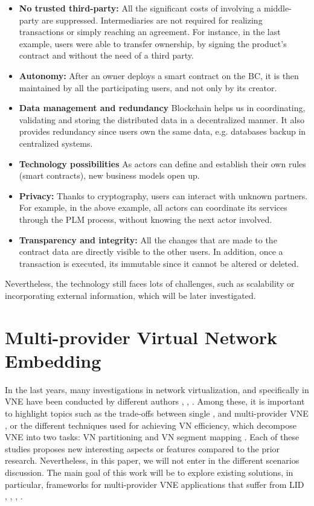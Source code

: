 \begin{itemize}
	\item \textbf{No trusted third-party:} All the significant costs of involving a middle-party are suppressed\citep{mainelli2015sharing}. Intermediaries are not required for realizing transactions or simply reaching an agreement. For instance, in the last example, users were able to transfer ownership, by signing the product's contract and without the need of a third party.
	\item \textbf{Autonomy:} After an owner deploys a smart contract on the BC, it is then maintained by all the participating users, and not only by its creator.
	\item \textbf{Data management and redundancy} Blockchain helps us in coordinating, validating and storing the distributed data in a decentralized manner. It also provides redundancy since users own the same data, e.g. databases backup in centralized systems. 
	\item \textbf{Technology possibilities} As actors can define and establish their own rules (smart contracts), new business models open up.
	\item \textbf{Privacy:} Thanks to cryptography, users can interact with unknown partners. For example, in the above example, all actors can coordinate its services through the PLM process, without knowing the next actor involved. 
    \item \textbf{Transparency and integrity:} All the changes that are made to the contract data are directly visible to the other users. In addition, once a transaction is executed, its immutable since it cannot be altered or deleted.
	
\end{itemize}

Nevertheless, the technology still faces lots of challenges, such as scalability or incorporating external information, which will be later investigated.

\section{Multi-provider Virtual Network Embedding}

In the last years, many investigations in network virtualization, and specifically in VNE have been conducted by different authors \citep{houidi2011virtual}, \citep{zhu2008cabernet}, \citep{chowdhury2009virtual}. Among these, it is important to highlight topics such as the trade-offs between single \citep{chowdhury2009virtual}, \citep{houidi2008distributed} and multi-provider VNE \citep{dietrich2017multi}, or the different techniques used for achieving VN efficiency, which decompose VNE into two tasks: VN partitioning and VN segment mapping \citep{fischer2013virtual}. Each of these studies proposes new interesting aspects or features compared to the prior research. Nevertheless, in this paper, we will not enter in the different scenarios discussion. The main goal of this work will be to explore existing solutions, in particular, frameworks for multi-provider VNE applications that suffer from LID \citep{dietrich2017multi}, \citep{zaheer2010multi}, \citep{esposito2013general}, \citep{chowdhury2010polyvine}.


